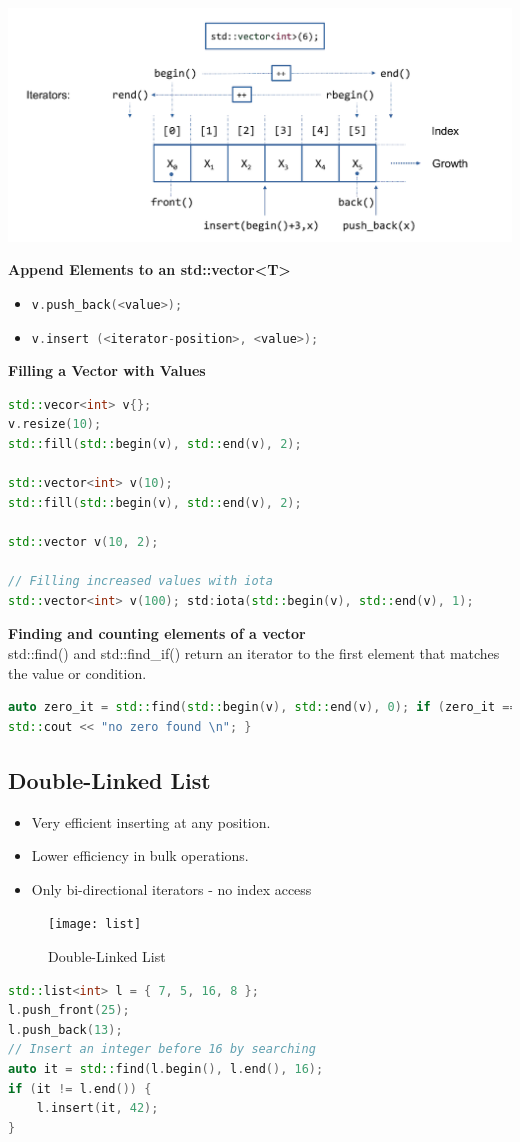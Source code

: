 \begin{center}
\includegraphics[width=0.75\linewidth]{images/vector}
\end{center}
\textbf{Append Elements to an std::vector<T>}
\begin{itemize}
  \itemsep -0.5em 
  \item \lstinline[language=C++]|v.push_back(<value>);|
  \item \lstinline[language=C++]|v.insert (<iterator-position>, <value>);|
\end{itemize}

\textbf{Filling a Vector with Values}
\begin{lstlisting}[language=C++]
std::vecor<int> v{};
v.resize(10);
std::fill(std::begin(v), std::end(v), 2);

std::vector<int> v(10); 
std::fill(std::begin(v), std::end(v), 2);

std::vector v(10, 2);

// Filling increased values with iota
std::vector<int> v(100); std:iota(std::begin(v), std::end(v), 1);
\end{lstlisting}

\textbf{Finding and counting elements of a vector} \\
 std::find() and std::find\_if() return an iterator to the first element that matches the value or condition.
\begin{lstlisting}[language=C++]
auto zero_it = std::find(std::begin(v), std::end(v), 0); if (zero_it == std::end(v)) {
std::cout << "no zero found \n"; }
\end{lstlisting}

\subsection{Double-Linked List}
\begin{itemize}
  \itemsep -0.5em 
  \item Very efficient inserting at any position.
  \item Lower efficiency in bulk operations.
  \item Only bi-directional iterators - no index access
\end{itemize}
\begin{figure}[h!]
  \centering
  \texttt{[image: list]}
  \caption{Double-Linked List}
\end{figure}
\begin{lstlisting}[language=C++]
std::list<int> l = { 7, 5, 16, 8 };
l.push_front(25);
l.push_back(13);
// Insert an integer before 16 by searching
auto it = std::find(l.begin(), l.end(), 16);
if (it != l.end()) {
	l.insert(it, 42);
}
\end{lstlisting}

